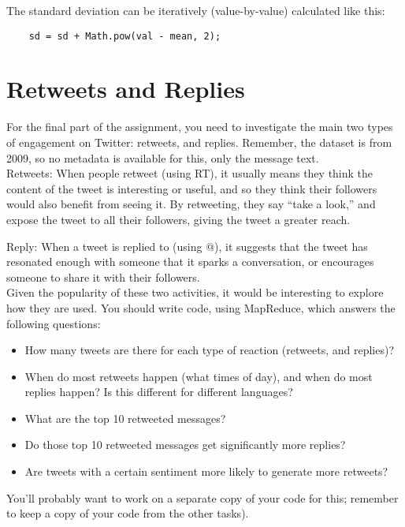 \documentclass[a4paper,10pt]{article}
\begin{document}
  The standard deviation can be iteratively (value-by-value) calculated like this: 
  \begin{lstlisting}
    sd = sd + Math.pow(val - mean, 2);
  \end{lstlisting}
  
  \section{Retweets and Replies}

  For the final part of the assignment, you need to investigate the main two types of
  engagement on Twitter: retweets, and replies. Remember, the dataset is from 2009,
  so no metadata is available for this, only the message text. \\

  Retweets: When people retweet (using RT), it usually means they think the content of the tweet is interesting or useful,
  and so they think their followers would also benefit from seeing it. By retweeting, they say ``take a look,''  and expose
  the tweet to all their followers, giving the tweet a greater reach.
  
  Reply: When a tweet is replied to (using @), it suggests that the tweet has
  resonated enough with someone that it sparks a conversation, or encourages
  someone to share it with their followers. \\

  Given the popularity of these two activities, it would be interesting to explore how they are used. You should write code, using MapReduce,
  which answers the following questions:

  \begin{itemize}
  \item How many tweets are there for each type of reaction (retweets, and replies)?
  \item When do most retweets happen (what times of day), and when do most replies happen? Is this different for different languages?
  \item What are the top 10 retweeted messages?
  \item Do those top 10 retweeted messages get significantly more replies?
  \item Are tweets with a certain sentiment more likely to generate more retweets?
  \end{itemize}

  You'll probably want to work on a separate copy of your code for this; remember to keep a copy of your code from the other tasks).
\end{document}
